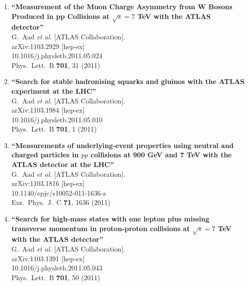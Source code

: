 \documentclass{article}
\begin{document}
\begin{enumerate}
\item%
{\bf ``Measurement of the Muon Charge Asymmetry from W Bosons Produced in pp Collisions at $\sqrt{s} = 7$ TeV with the ATLAS detector''}
  \\{}G.~Aad {\it et al.}  [ATLAS Collaboration].
  \\{}arXiv:1103.2929 [hep-ex]
    \\{}10.1016/j.physletb.2011.05.024
\\{}Phys.\ Lett.\ B {\bf 701}, 31 (2011) %


\item%
{\bf ``Search for stable hadronising squarks and gluinos with the ATLAS experiment at the LHC''}
  \\{}G.~Aad {\it et al.}  [ATLAS Collaboration].
  \\{}arXiv:1103.1984 [hep-ex]
    \\{}10.1016/j.physletb.2011.05.010
\\{}Phys.\ Lett.\ B {\bf 701}, 1 (2011) %


\item%
{\bf ``Measurements of underlying-event properties using neutral and charged particles in $pp$ collisions at 900 GeV and 7 TeV with the ATLAS detector at the LHC''}
  \\{}G.~Aad {\it et al.}  [ATLAS Collaboration].
  \\{}arXiv:1103.1816 [hep-ex]
    \\{}10.1140/epjc/s10052-011-1636-z
\\{}Eur.\ Phys.\ J.\ C {\bf 71}, 1636 (2011) %


\item%
{\bf ``Search for high-mass states with one lepton plus missing transverse momentum in proton-proton collisions at $\sqrt{s} = 7$ TeV with the ATLAS detector''}
  \\{}G.~Aad {\it et al.}  [ATLAS Collaboration].
  \\{}arXiv:1103.1391 [hep-ex]
    \\{}10.1016/j.physletb.2011.05.043
\\{}Phys.\ Lett.\ B {\bf 701}, 50 (2011) %



\end{enumerate}
\end{document}
